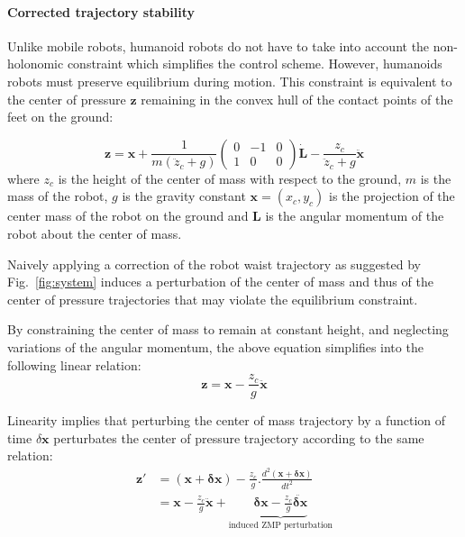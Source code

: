 \paragraph{Corrected trajectory stability}
Unlike mobile robots, humanoid robots do not have to take into account
the non-holonomic constraint which simplifies the control
scheme. However, humanoids robots must preserve equilibrium during
motion. This constraint is equivalent to the center of pressure $\mathbf{z}$
remaining in the convex hull of the contact points of the feet on the ground:


\begin{equation} \label{eq:zmp1}
  \mathbf{z} = \mathbf{x} + \frac{1}{m(\ddot{z}_c +
    g)}\left(\begin{array}{ccc} 0 &-1 &0\\1 &0 &0\end{array}\right)
    \mathbf{\dot{\textbf{L}}} - \frac{z_c}{\ddot{z}_c + g}
    \ddot{\mathbf{x}}
\end{equation}
where $z_c$ is the height of the center of mass with respect to the
ground, $m$ is the mass of the robot, $g$ is the gravity constant
\mbox{$\mathbf{x}=(x_c,y_c)$} is the projection of the center mass of
the robot on the ground and $\textbf{L}$ is the angular momentum of
the robot about the center of mass.

Naively applying a correction of the robot waist trajectory as
suggested by Fig.~\ref{fig:system} induces a perturbation of the
center of mass and thus of the center of pressure trajectories that
may violate the equilibrium constraint.

By constraining the center of mass to remain at constant height, and neglecting
variations of the angular momentum, the above equation simplifies into the
following linear relation:
\begin{equation} \label{eq:zmp2}
  \mathbf{z} = \mathbf{x}  - \frac{z_c}{g} \ddot{\mathbf{x}}
\end{equation}

Linearity implies that perturbing the center of mass trajectory by a
function of time \mbox{$\delta \mathbf{x}$} perturbates the center of
pressure trajectory according to the same relation:
\begin{equation} \label{eq:zmpperturbation}
\begin{split}
  \mathbf{z'} &= (\mathbf{x} + \mathbf{\delta x}) - \frac{z_c}{g} .
  \frac{d^2 (\mathbf{x} + \mathbf{\delta x})}{d t^2}\\
  &= \mathbf{x} - \frac{z_c}{g} \ddot{\mathbf{x}} +
  \underbrace{\mathbf{\delta x} - \frac{z_c}{g} \ddot{\mathbf{\delta
        x}}}_{\text{induced ZMP perturbation}}
\end{split}
\end{equation}

